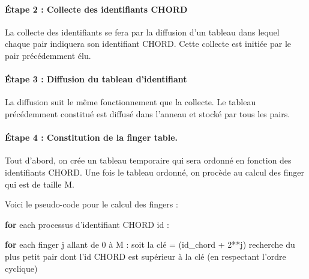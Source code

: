 \documentclass[
]{article}
\newenvironment{Shaded}{}{}
\newcommand{\BuiltInTok}[1]{#1}
\newcommand{\ControlFlowTok}[1]{\textcolor[rgb]{0.00,0.44,0.13}{\textbf{#1}}}
\newcommand{\DecValTok}[1]{\textcolor[rgb]{0.25,0.63,0.44}{#1}}
\newcommand{\NormalTok}[1]{#1}
\newcommand{\OperatorTok}[1]{\textcolor[rgb]{0.40,0.40,0.40}{#1}}
\begin{document}
\hypertarget{uxe9tape-2-collecte-des-identifiants-chord}{%
\paragraph{Étape 2 : Collecte des identifiants
CHORD}\label{uxe9tape-2-collecte-des-identifiants-chord}}

La collecte des identifiants se fera par la diffusion d'un tableau dans
lequel chaque pair indiquera son identifiant CHORD. Cette collecte est
initiée par le pair précédemment élu.

\hypertarget{uxe9tape-3-diffusion-du-tableau-didentifiant}{%
\paragraph{Étape 3 : Diffusion du tableau
d'identifiant}\label{uxe9tape-3-diffusion-du-tableau-didentifiant}}

La diffusion suit le même fonctionnement que la collecte. Le tableau
précédemment constitué est diffusé dans l'anneau et stocké par tous les
pairs.

\hypertarget{uxe9tape-4-constitution-de-la-finger-table.}{%
\paragraph{Étape 4 : Constitution de la finger
table.}\label{uxe9tape-4-constitution-de-la-finger-table.}}

Tout d'abord, on crée un tableau temporaire qui sera ordonné en fonction
des identifiants CHORD. Une fois le tableau ordonné, on procède au
calcul des finger qui est de taille M.

Voici le pseudo-code pour le calcul des fingers :

\begin{Shaded}
\begin{Highlighting}[]
\ControlFlowTok{for}\NormalTok{ each processus d’identifiant CHORD }\BuiltInTok{id}\NormalTok{ :}

  \ControlFlowTok{for}\NormalTok{ each finger j allant de }\DecValTok{0}\NormalTok{ à M :}
\NormalTok{      soit la clé }\OperatorTok{=}\NormalTok{ (id\_chord }\OperatorTok{+} \DecValTok{2}\OperatorTok{**}\NormalTok{j)}
\NormalTok{      recherche du plus petit pair dont l’id CHORD est supérieur à la clé }
\NormalTok{                                       (en respectant l’ordre cyclique)}
\end{Highlighting}
\end{Shaded}
\end{document}
